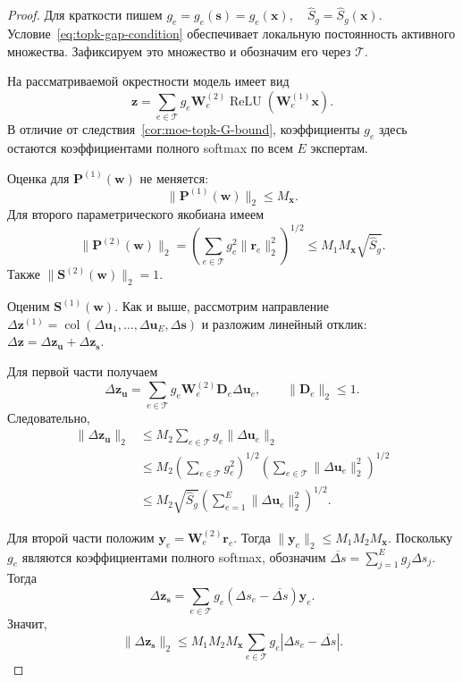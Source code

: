 \documentclass[11pt]{extarticle}
\DeclareMathOperator{\ReLU}{ReLU}
\DeclareMathOperator{\col}{col}
\theoremstyle{definition}
\theoremstyle{plain}
\theoremstyle{remark}
\begin{document}
\begin{proof}
Для краткости пишем
$
    g_e=g_e(\mathbf s)=g_e(\mathbf x),
    \quad
    \hat S_g=\hat S_g(\mathbf x).
$
Условие~\eqref{eq:topk-gap-condition} обеспечивает локальную постоянность активного множества. Зафиксируем это множество и обозначим его через $\mathcal T$.

На рассматриваемой окрестности модель имеет вид
$$
\mathbf z
=
\sum\limits_{e\in\mathcal T}
g_e
\mathbf W_e^{(2)}
\ReLU\!\left(\mathbf W_e^{(1)}\mathbf x\right).
$$
В отличие от следствия~\ref{cor:moe-topk-G-bound}, коэффициенты $g_e$ здесь остаются коэффициентами полного softmax по всем $E$ экспертам.

Оценка для $\mathbf P^{(1)}(\mathbf w)$ не меняется:
$$
\|\mathbf P^{(1)}(\mathbf w)\|_2\le M_{\mathbf x}.
$$
Для второго параметрического якобиана имеем
$$
\|\mathbf P^{(2)}(\mathbf w)\|_2
=
\left(
\sum\limits_{e\in\mathcal T}
g_e^2\|\mathbf r_e\|_2^2
\right)^{1/2}
\le
M_1M_{\mathbf x}\sqrt{\hat S_g}.
$$
Также $\|\mathbf S^{(2)}(\mathbf w)\|_2=1$.

Оценим $\mathbf S^{(1)}(\mathbf w)$. Как и выше, рассмотрим направление
$
\Delta\mathbf z^{(1)}
=
\col(\Delta\mathbf u_1,\ldots,\Delta\mathbf u_E,\Delta\mathbf s)
$
и разложим линейный отклик:
$
\Delta\mathbf z=\Delta\mathbf z_{\mathbf u}+\Delta\mathbf z_{\mathbf s}.
$

Для первой части получаем
$$
\Delta\mathbf z_{\mathbf u}
=
\sum\limits_{e\in\mathcal T}
g_e\mathbf W_e^{(2)}\mathbf D_e\Delta\mathbf u_e,
\qquad
\|\mathbf D_e\|_2\le 1.
$$
Следовательно,
$$
\begin{aligned}
\|\Delta\mathbf z_{\mathbf u}\|_2
&\le
M_2
\sum\limits_{e\in\mathcal T}
g_e\|\Delta\mathbf u_e\|_2 \\
&\le
M_2
\left(
\sum\limits_{e\in\mathcal T}g_e^2
\right)^{1/2}
\left(
\sum\limits_{e\in\mathcal T}
\|\Delta\mathbf u_e\|_2^2
\right)^{1/2} \\
&\le
M_2\sqrt{\hat S_g}
\left(
\sum\limits_{e=1}^{E}
\|\Delta\mathbf u_e\|_2^2
\right)^{1/2}.
\end{aligned}
$$

Для второй части положим
$
\mathbf y_e=\mathbf W_e^{(2)}\mathbf r_e.
$
Тогда
$
\|\mathbf y_e\|_2\le M_1M_2M_{\mathbf x}.
$
Поскольку $g_e$ являются коэффициентами полного softmax, обозначим
$
\overline{\Delta s}
=
\sum\limits_{j=1}^{E}g_j\Delta s_j.
$
Тогда
$$
\Delta\mathbf z_{\mathbf s}
=
\sum\limits_{e\in\mathcal T}
g_e
\left(
\Delta s_e-\overline{\Delta s}
\right)
\mathbf y_e.
$$
Значит,
$$
\|\Delta\mathbf z_{\mathbf s}\|_2
\le
M_1M_2M_{\mathbf x}
\sum\limits_{e\in\mathcal T}
g_e
\left|
\Delta s_e-\overline{\Delta s}
\right|.
$$


\end{proof}
\end{document}
